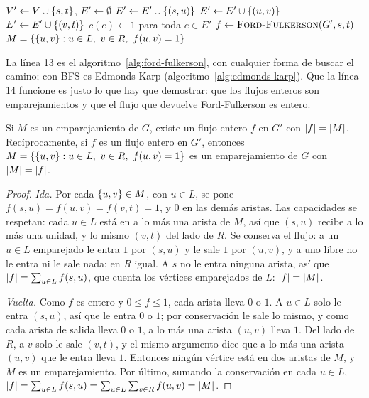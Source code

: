 \documentclass[11pt,letterpaper]{article}
\begin{document}
\begin{algorithm}[H]
\caption{\textsc{Emparejamiento-Bipartito}$(G, L, R)$}
\label{alg:emparejamiento-flujo}
\begin{algorithmic}[1]
  \State $V' \gets V \cup \left\{ s, t \right\}$, \quad $E' \gets \emptyset$
    \State $E' \gets E' \cup \left\{ (s, u) \right\}$
  \EndFor
    \State $E' \gets E' \cup \left\{ (u, v) \right\}$ 
  \EndFor
    \State $E' \gets E' \cup \left\{ (v, t) \right\}$
  \EndFor
  \State $c(e) \gets 1$ para toda $e \in E'$
  \State $f \gets \textsc{Ford-Fulkerson}(G', s, t)$
  \State \Return $M = \left\{ \left\{ u, v \right\} : u \in L,\ v \in R,\
         f(u, v) = 1 \right\}$
\EndProcedure
\end{algorithmic}
\end{algorithm}

La línea 13 es el algoritmo~\ref{alg:ford-fulkerson}, con cualquier
forma de buscar el camino; con BFS es Edmonds-Karp
(algoritmo~\ref{alg:edmonds-karp}). Que la línea 14 funcione es justo
lo que hay que demostrar: que los flujos enteros son emparejamientos y
que el flujo que devuelve Ford-Fulkerson es entero.

\begin{lema}
  \label{lem:emparejamiento-flujo}
  Si $M$ es un emparejamiento de $G$, existe un flujo entero $f$ en
  $G'$ con $\left\lvert f \right\rvert = \left\lvert M \right\rvert$. Recíprocamente, si $f$ es un flujo
  entero en $G'$, entonces
  $M = \left\{ \left\{ u, v \right\} : u \in L,\ v \in R,\ f(u, v) = 1 \right\}$ es un
  emparejamiento de $G$ con $\left\lvert M \right\rvert = \left\lvert f \right\rvert$.
\end{lema}

\begin{proof}
  \textit{Ida.} Por cada $\left\{ u, v \right\} \in M$, con $u \in L$, se pone
  $f(s, u) = f(u, v) = f(v, t) = 1$, y $0$ en las demás aristas. Las
  capacidades se respetan: cada $u \in L$ está en a lo más una arista
  de $M$, así que $(s, u)$ recibe a lo más una unidad, y lo mismo
  $(v, t)$ del lado de $R$. Se conserva el flujo: a un $u \in L$
  emparejado le entra $1$ por $(s, u)$ y le sale $1$ por $(u, v)$, y a
  uno libre no le entra ni le sale nada; en $R$ igual. A $s$ no le
  entra ninguna arista, así que
  $\left\lvert f \right\rvert = \sum_{u \in L} f(s, u)$, que cuenta los vértices
  emparejados de $L$: $\left\lvert f \right\rvert = \left\lvert M \right\rvert$.

  \textit{Vuelta.} Como $f$ es entero y $0 \le f \le 1$, cada arista
  lleva $0$ o $1$. A $u \in L$ solo le entra $(s, u)$, así que le
  entra $0$ o $1$; por conservación le sale lo mismo, y como cada
  arista de salida lleva $0$ o $1$, a lo más una arista $(u, v)$
  lleva $1$. Del lado de $R$, a $v$ solo le sale $(v, t)$, y el mismo
  argumento dice que a lo más una arista $(u, v)$ que le entra lleva
  $1$. Entonces ningún vértice está en dos aristas de $M$, y $M$ es
  un emparejamiento. Por último, sumando la conservación en cada
  $u \in L$,
  $\left\lvert f \right\rvert = \sum_{u \in L} f(s, u)
           = \sum_{u \in L} \sum_{v \in R} f(u, v) = \left\lvert M \right\rvert$.
\end{proof}
\end{document}
